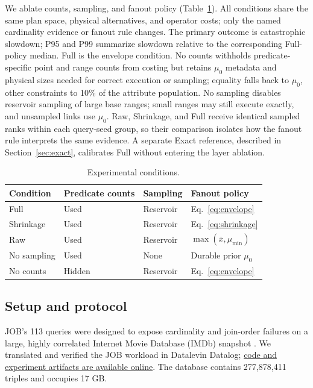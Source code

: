 \documentclass[sigconf]{cidr-2027}
\begin{document}
We ablate counts, sampling, and fanout policy (Table~\ref{tab:conditions}).
All conditions share the same plan space, physical alternatives, and operator
costs; only the named cardinality evidence or fanout rule changes. The primary
outcome is catastrophic slowdown; P95 and P99 summarize slowdown relative to
the corresponding Full-policy median. Full is the envelope condition. No
counts withholds predicate-specific point and range counts from costing but
retains $\mu_0$ metadata and physical sizes needed for correct execution or
sampling; equality falls back to $\mu_0$, other constraints to 10\% of the
attribute population. No sampling disables reservoir sampling of large base
ranges; small ranges may still execute exactly, and unsampled links use
$\mu_0$. Raw, Shrinkage, and Full receive identical sampled ranks within each
query-seed group, so their comparison isolates how the fanout rule interprets
the same evidence. A separate Exact reference, described in
Section~\ref{sec:exact}, calibrates Full without entering the layer ablation.

\begin{table}[H]
  \caption{Experimental conditions.}
  \label{tab:conditions}
  \centering
  \small
  \begin{tabular}{llll}
    \toprule
    Condition & Predicate counts & Sampling & Fanout policy \\
    \midrule
    Full        & Used   & Reservoir & Eq.~\ref{eq:envelope} \\
    Shrinkage   & Used   & Reservoir & Eq.~\ref{eq:shrinkage} \\
    Raw         & Used   & Reservoir & $\max(\bar{x},\mu_{\min})$ \\
    No sampling & Used   & None      & Durable prior $\mu_0$ \\
    No counts   & Hidden & Reservoir & Eq.~\ref{eq:envelope} \\
    \bottomrule
  \end{tabular}
\end{table}

\subsection{Setup and protocol}

JOB's 113 queries were designed to expose cardinality and join-order failures
on a large, highly correlated Internet Movie Database (IMDb) snapshot
\cite{leis2015optimizers}. We translated and verified the JOB workload in
Datalevin Datalog; \href{https://github.com/datalevin/datalevin/tree/cidr2027/benchmarks/JOB-bench/artifacts/cidr2027}{code and experiment artifacts are available online}.
The database contains 277,878,411 triples and occupies 17 GB.
\end{document}
